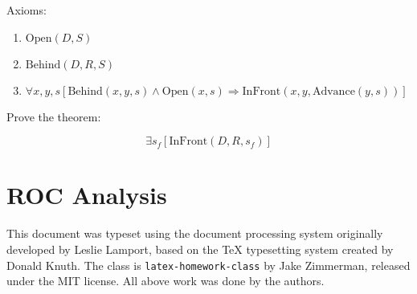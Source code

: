 \documentclass[11pt,largemargins, anonymous]{homework}
\begin{document}
Axioms:

\begin{enumerate}
    \item \( \mathrm{Open}(D, S) \)
    \item \( \mathrm{Behind}(D, R, S) \)
    \item \( \forall x, y, s [ \mathrm{Behind}(x, y, s) \land \mathrm{Open}(x, s) \Rightarrow \mathrm{InFront}(x, y, \mathrm{Advance}(y, s)) ] \)
\end{enumerate}

Prove the theorem:

\[ \exists s_f [ \mathrm{InFront}(D, R, s_f)] \]

\part{ROC Analysis}


\begin{colophon}
    This document was typeset using the \LaTeXe{} document processing system
    originally developed by Leslie Lamport, based on the \TeX{} typesetting system
    created by Donald Knuth.
    The class is \texttt{latex-homework-class} by Jake Zimmerman,
    released under the MIT license.
    All above work was done by the authors.
\end{colophon}
\end{document}
